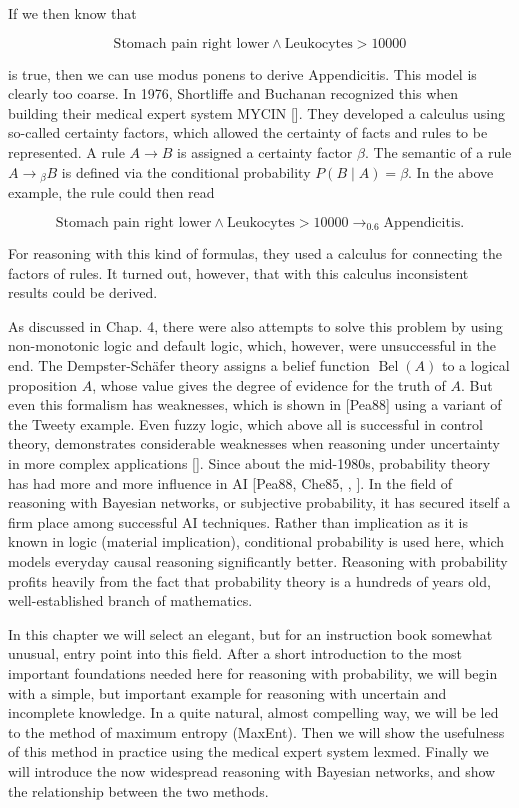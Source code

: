 \documentclass[10pt]{book}
\begin{document}
If we then know that

$$
\text{Stomach pain right lower} \wedge \text{Leukocytes} > 10000
$$

is true, then we can use modus ponens to derive Appendicitis. This model is clearly too coarse. In 1976, Shortliffe and Buchanan recognized this when building their medical expert system MYCIN [\cite{shortliffe1976mycin}]. They developed a calculus using so-called certainty factors, which allowed the certainty of facts and rules to be represented. A rule $A \rightarrow B$ is assigned a certainty factor $\beta$. The semantic of a rule $A \rightarrow{ }_{\beta} B$ is defined via the conditional probability $P(B \mid A)=\beta$. In the above example, the rule could then read

$$
\text{Stomach pain right lower} \wedge \text{Leukocytes} > 10000 \rightarrow_{0.6} \text{Appendicitis.}
$$

For reasoning with this kind of formulas, they used a calculus for connecting the factors of rules. It turned out, however, that with this calculus inconsistent results could be derived.

As discussed in Chap. 4, there were also attempts to solve this problem by using non-monotonic logic and default logic, which, however, were unsuccessful in the end. The Dempster-Schäfer theory assigns a belief function $\operatorname{Bel}(A)$ to a logical proposition $A$, whose value gives the degree of evidence for the truth of $A$. But even this formalism has weaknesses, which is shown in [Pea88] using a variant of the Tweety example. Even fuzzy logic, which above all is successful in control theory, demonstrates considerable weaknesses when reasoning under uncertainty in more complex applications [\cite{elkan1993fuzzy}].
Since about the mid-1980s, probability theory has had more and more influence in AI [Pea88, Che85, \cite{whittaker1996graphical}, \cite{jensen2001bayesnet}]. In the field of reasoning with Bayesian networks, or subjective probability, it has secured itself a firm place among successful AI techniques. Rather than implication as it is known in logic (material implication), conditional probability is used here, which models everyday causal reasoning significantly better. Reasoning with probability profits heavily from the fact that probability theory is a hundreds of years old, well-established branch of mathematics.

In this chapter we will select an elegant, but for an instruction book somewhat unusual, entry point into this field. After a short introduction to the most important foundations needed here for reasoning with probability, we will begin with a simple, but important example for reasoning with uncertain and incomplete knowledge. In a quite natural, almost compelling way, we will be led to the method of maximum entropy (MaxEnt). Then we will show the usefulness of this method in practice using the medical expert system lexmed. Finally we will introduce the now widespread reasoning with Bayesian networks, and show the relationship between the two methods.
\end{document}

